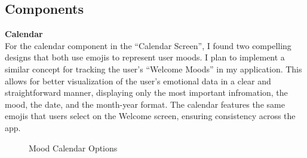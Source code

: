 \subsection{Components}

\noindent \textbf{Calendar} \\
For the calendar component in the ``Calendar Screen'', I found two compelling designs that both use emojis to represent user moods. I plan to implement a similar concept for tracking the user’s ``Welcome Moods'' in my application. This allows for better visualization of the user's emotional data in a clear and straightforward manner, displaying only the most important infromation, the mood, the date, and the month-year format. The calendar features the same emojis that users select on the Welcome screen, ensuring consistency across the app.

\vspace{5mm}

\FloatBarrier
\begin{figure}[htbp]
    \centering
    \label{fig:mood_calendar_1}
    \hfill
    \label{fig:mood_calendar_2}
    \caption{Mood Calendar Options}
\end{figure}
\FloatBarrier

